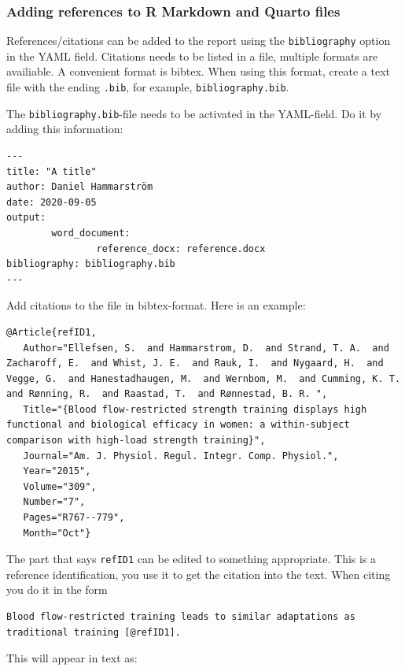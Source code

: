 \documentclass[
  11pt,
  letterpaper,
]{scrbook}
\begin{document}
\hypertarget{adding-references-to-r-markdown-and-quarto-files}{%
\subsubsection{Adding references to R Markdown and Quarto
files}\label{adding-references-to-r-markdown-and-quarto-files}}

References/citations can be added to the report using the
\texttt{bibliography} option in the YAML field. Citations needs to be
listed in a file, multiple formats are availiable. A convenient format
is bibtex. When using this format, create a text file with the ending
\texttt{.bib}, for example, \texttt{bibliography.bib}.

The \texttt{bibliography.bib}-file needs to be activated in the
YAML-field. Do it by adding this information:

\begin{verbatim}
---
title: "A title"
author: Daniel Hammarström
date: 2020-09-05
output: 
        word_document:
                reference_docx: reference.docx
bibliography: bibliography.bib
---
\end{verbatim}

Add citations to the file in bibtex-format. Here is an example:

\begin{verbatim}
@Article{refID1,
   Author="Ellefsen, S.  and Hammarstrom, D.  and Strand, T. A.  and Zacharoff, E.  and Whist, J. E.  and Rauk, I.  and Nygaard, H.  and Vegge, G.  and Hanestadhaugen, M.  and Wernbom, M.  and Cumming, K. T.  and Rønning, R.  and Raastad, T.  and Rønnestad, B. R. ",
   Title="{Blood flow-restricted strength training displays high functional and biological efficacy in women: a within-subject comparison with high-load strength training}",
   Journal="Am. J. Physiol. Regul. Integr. Comp. Physiol.",
   Year="2015",
   Volume="309",
   Number="7",
   Pages="R767--779",
   Month="Oct"}
\end{verbatim}

The part that says \texttt{refID1} can be edited to something
appropriate. This is a reference identification, you use it to get the
citation into the text. When citing you do it in the form

\begin{verbatim}
Blood flow-restricted training leads to similar adaptations as traditional training [@refID1].
\end{verbatim}

This will appear in text as:
\end{document}
